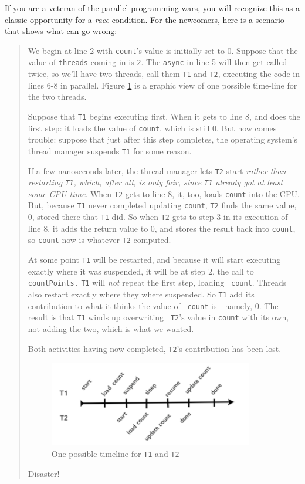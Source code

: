 If you are a
veteran of the parallel programming wars, you will recognize this as a classic
opportunity for a {\em race} condition. For the newcomers, here is a scenario
that shows what can go wrong:
\begin{quote}
We begin at line 2 with {\tt count}'s value is initially set to 0.
Suppose that the value of {\tt threads} coming in is {\tt 2}.
The {\tt async} in line 5 will then get called twice, so we'll have
two threads, call them {\tt T1} and {\tt T2}, executing the code
in lines 6-8 in parallel.  Figure \ref{fig:tml} is a graphic view
of one possible time-line for the two threads.

Suppose that {\tt T1} begins
executing first.  When it gets to line 8, and does the first step: it loads the
value of {\tt count}, which is still 0. But now comes trouble: suppose that
just after this step completes, the operating system's thread manager suspends
{\tt T1} for some reason.  

If a few nanoseconds later, the thread manager lets {\tt T2} start {\em rather
than restarting {\tt T1}, which, after all, is only fair, since {\tt T1}
already got at least some CPU time}. When {\tt T2} gets to line 8, it, too,
loads {\tt count} into the CPU. But, because {\tt T1} never completed updating
{\tt count}, {\tt T2} finds the same value, 0, stored there that {\tt T1} did.
So when {\tt T2} gets to step 3 in its execution of line 8, it adds
the return value to 0, and stores the result back into {\tt count},
so {\tt count} now is whatever {\tt T2} computed.

At some point {\tt T1} will be restarted, and because it will start executing
exactly where it was suspended, it will be at step 2, the call to {\tt
countPoints.}  {\tt T1} will {\em not} repeat the first step, loading {\tt
count}.  Threads also restart exactly where they where suspended.
So {\tt T1} add its contribution to what it thinks the value of {\tt
count} is---namely, 0.  The result is that {\tt T1} winds up overwriting {\tt
T2}'s value in {\tt count} with its own, not adding the two, which is what
we wanted.

Both activities having now completed, {\tt T2}'s contribution has been
lost.

\begin{figure}[!htbp]
\begin{center} 
\includegraphics[width=3.5in]{"images/timeline"} 
\caption{One possible timeline for {\tt T1} and {\tt T2}}
\label{fig:tml}
\end{center}
\end{figure}

Disaster!
\end{quote}
